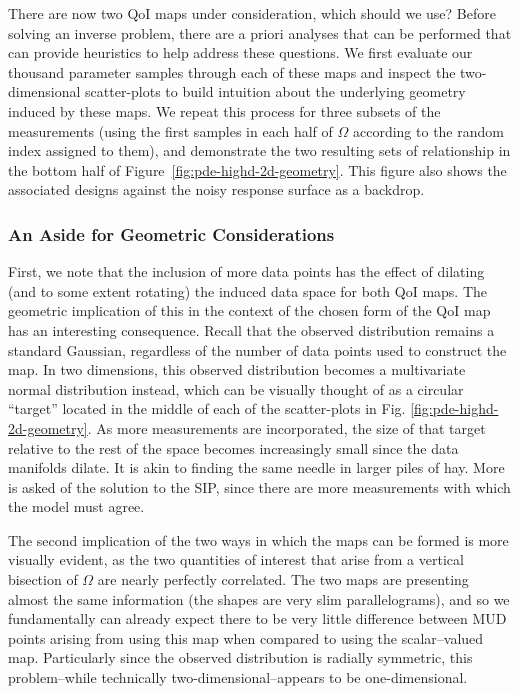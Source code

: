 There are now two QoI maps under consideration, which should we use?
Before solving an inverse problem, there are a priori analyses that can be performed that can provide heuristics to help address these questions.
We first evaluate our thousand parameter samples through each of these maps and inspect the two-dimensional scatter-plots to build intuition about the underlying geometry induced by these maps.
We repeat this process for three subsets of the measurements (using the first samples in each half of $\Omega$ according to the random index assigned to them), and demonstrate the two resulting sets of relationship in the bottom half of Figure~\ref{fig:pde-highd-2d-geometry}.
This figure also shows the associated designs against the noisy response surface as a backdrop.

\subsubsection{An Aside for Geometric Considerations}

First, we note that the inclusion of more data points has the effect of dilating (and to some extent rotating) the induced data space for both QoI maps.
The geometric implication of this in the context of the chosen form of the QoI map has an interesting consequence.
Recall that the observed distribution remains a standard Gaussian, regardless of the number of data points used to construct the map.
In two dimensions, this observed distribution becomes a multivariate normal distribution instead, which can be visually thought of as a circular ``target'' located in the middle of each of the scatter-plots in Fig. \ref{fig:pde-highd-2d-geometry}.
As more measurements are incorporated, the size of that target relative to the rest of the space becomes increasingly small since the data manifolds dilate.
It is akin to finding the same needle in larger piles of hay.
More is asked of the solution to the SIP, since there are more measurements with which the model must agree.

The second implication of the two ways in which the maps can be formed is more visually evident, as the two quantities of interest that arise from a vertical bisection of $\Omega$ are nearly perfectly correlated.
The two maps are presenting almost the same information (the shapes are very slim parallelograms), and so we fundamentally can already expect there to be very little difference between MUD points arising from using this map when compared to using the scalar--valued map.
Particularly since the observed distribution is radially symmetric, this problem\---while technically two-dimensional\---appears to be one-dimensional.

